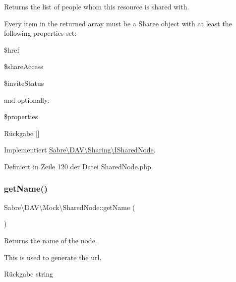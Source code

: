 Returns the list of people whom this resource is shared with.

Every item in the returned array must be a Sharee object with at least the following properties set\+:


\begin{DoxyItemize}
\item \$href
\item \$share\+Access
\item \$invite\+Status
\end{DoxyItemize}

and optionally\+:


\begin{DoxyItemize}
\item \$properties
\end{DoxyItemize}

\begin{DoxyReturn}{Rückgabe}
\mbox{[}\mbox{]} 
\end{DoxyReturn}


Implementiert \mbox{\hyperlink{interface_sabre_1_1_d_a_v_1_1_sharing_1_1_i_shared_node_aa4646ed6e564d50969a4117f0f03eecd}{Sabre\textbackslash{}\+D\+A\+V\textbackslash{}\+Sharing\textbackslash{}\+I\+Shared\+Node}}.



Definiert in Zeile 120 der Datei Shared\+Node.\+php.

\mbox{\label{class_sabre_1_1_d_a_v_1_1_mock_1_1_shared_node_ab4c6b66df500d3d781025ad0c16fa928}} 
\subsubsection{\texorpdfstring{get\+Name()}{getName()}}
{\footnotesize\ttfamily Sabre\textbackslash{}\+D\+A\+V\textbackslash{}\+Mock\textbackslash{}\+Shared\+Node\+::get\+Name (\begin{DoxyParamCaption}{ }\end{DoxyParamCaption})}

Returns the name of the node.

This is used to generate the url.

\begin{DoxyReturn}{Rückgabe}
string 
\end{DoxyReturn}


